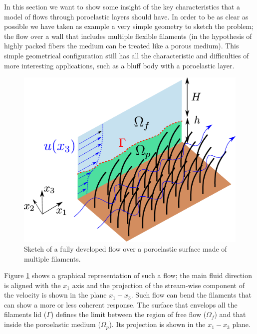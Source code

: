 In this section we want to show some insight of the key characteristics that a model of flows through poroelastic layers should have.
In order to be as clear as possible we have taken as example a very simple geometry to sketch the problem; the flow over a wall that includes multiple flexible filaments (in the hypothesis of highly packed fibers the medium can be treated like a porous medium). 
This simple geometrical configuration still has all the characteristic and difficulties of more interesting applications, such as a bluff body with a poroelastic layer.

\begin{figure}[h]
	\centering
	\includegraphics[width=0.7\linewidth]{chapter_1/problem_schema}
	\caption{Sketch of a fully developed flow over a poroelastic surface made of multiple filaments.}
	\label{fig:schema_problem}
\end{figure}

Figure \ref{fig:schema_problem} shows a graphical representation of such a flow; the main fluid direction is aligned with the $x_1$ axis and the projection of the stream-wise component of the velocity is shown in the plane $x_1 - x_3$.
Such flow can bend the filaments that can show a more or less coherent response.
The surface that envelops all the filaments lid ($\Gamma$) defines the limit between the region of free flow ($\Omega_{f}$) and that inside the poroelastic medium ($\Omega_{p}$). Its projection is shown in the  $x_1 - x_3$ plane.

